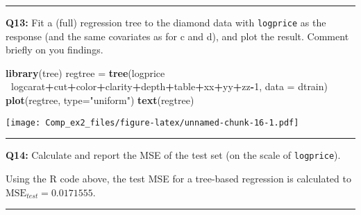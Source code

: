 \documentclass[]{article}
\newenvironment{Shaded}{\begin{snugshade}}{\end{snugshade}}
\newcommand{\KeywordTok}[1]{\textcolor[rgb]{0.13,0.29,0.53}{\textbf{#1}}}
\newcommand{\DataTypeTok}[1]{\textcolor[rgb]{0.13,0.29,0.53}{#1}}
\newcommand{\DecValTok}[1]{\textcolor[rgb]{0.00,0.00,0.81}{#1}}
\newcommand{\StringTok}[1]{\textcolor[rgb]{0.31,0.60,0.02}{#1}}
\newcommand{\OperatorTok}[1]{\textcolor[rgb]{0.81,0.36,0.00}{\textbf{#1}}}
\newcommand{\NormalTok}[1]{#1}
\begin{document}
\begin{center}\rule{0.5\linewidth}{\linethickness}\end{center}

\textbf{Q13:} Fit a (full) regression tree to the diamond data with
\texttt{logprice} as the response (and the same covariates as for c and
d), and plot the result. Comment briefly on you findings.

\begin{Shaded}
\begin{Highlighting}[]
\KeywordTok{library}\NormalTok{(tree)}
\NormalTok{regtree =}\StringTok{ }\KeywordTok{tree}\NormalTok{(logprice }\OperatorTok{~}\NormalTok{logcarat}\OperatorTok{+}\NormalTok{cut}\OperatorTok{+}\NormalTok{color}\OperatorTok{+}\NormalTok{clarity}\OperatorTok{+}\NormalTok{depth}\OperatorTok{+}\NormalTok{table}\OperatorTok{+}\NormalTok{xx}\OperatorTok{+}\NormalTok{yy}\OperatorTok{+}\NormalTok{zz}\OperatorTok{-}\DecValTok{1}\NormalTok{, }\DataTypeTok{data =}\NormalTok{ dtrain)}
\KeywordTok{plot}\NormalTok{(regtree, }\DataTypeTok{type=}\StringTok{"uniform"}\NormalTok{)}
\KeywordTok{text}\NormalTok{(regtree)}
\end{Highlighting}
\end{Shaded}

\texttt{[image: Comp\_ex2\_files/figure-latex/unnamed-chunk-16-1.pdf]}

\begin{center}\rule{0.5\linewidth}{\linethickness}\end{center}

\textbf{Q14:} Calculate and report the MSE of the test set (on the scale
of \texttt{logprice}).

\begin{Shaded}
\end{Shaded}

Using the R code above, the test MSE for a tree-based regression is
calculated to \(\text{MSE}_{test} = 0.0171555\).

\begin{center}\rule{0.5\linewidth}{\linethickness}\end{center}
\end{document}
